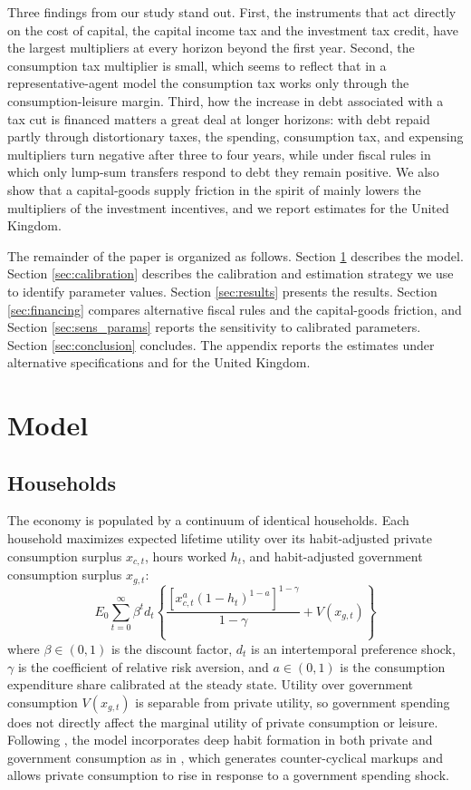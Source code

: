 \documentclass[article,11pt,letterpaper,fleqn]{article}
\theoremstyle{definition}
\numberwithin{equation}{section}
\begin{document}
Three findings from our study stand out. First, the instruments that act directly on the cost of capital, the capital income tax and the investment tax credit, have the largest multipliers at every horizon beyond the first year. Second, the consumption tax multiplier is small, which seems to reflect that in a representative-agent model the consumption tax works only through the consumption-leisure margin. Third, how the increase in debt associated with a tax cut is financed matters a great deal at longer horizons: with debt repaid partly through distortionary taxes, the spending, consumption tax, and expensing multipliers turn negative after three to four years, while under fiscal rules in which only lump-sum transfers respond to debt they remain positive. We also show that a capital-goods supply friction in the spirit of \citet{House_Shapiro_2008} mainly lowers the multipliers of the investment incentives, and we report estimates for the United Kingdom.

The remainder of the paper is organized as follows.  Section \ref{sec:model} describes the model.  Section \ref{sec:calibration} describes the calibration and estimation strategy we use to identify parameter values.  Section \ref{sec:results} presents the results. Section \ref{sec:financing} compares alternative fiscal rules and the capital-goods friction, and Section \ref{sec:sens_params} reports the sensitivity to calibrated parameters.  Section \ref{sec:conclusion} concludes. The appendix reports the estimates under alternative specifications and for the United Kingdom.

\section{Model}
\label{sec:model}

\subsection{Households}
The economy is populated by a continuum of identical households. Each household maximizes expected lifetime utility over its habit-adjusted private consumption surplus $x_{c,t}$, hours worked $h_t$, and habit-adjusted government consumption surplus $x_{g,t}$:
\begin{equation}\label{eq:utility}
E_{0}\sum_{t=0}^{\infty}\beta^{t} d_t \left\{ \frac{\left[x_{c,t}^{a}(1-h_{t})^{1-a}\right]^{1-\gamma}}{1-\gamma} + V(x_{g,t}) \right\}
\end{equation}
where $\beta \in (0,1)$ is the discount factor, $d_t$ is an intertemporal preference shock, $\gamma$ is the coefficient of relative risk aversion, and $a \in (0,1)$ is the consumption expenditure share calibrated at the steady state. Utility over government consumption $V(x_{g,t})$ is separable from private utility, so government spending does not directly affect the marginal utility of private consumption or leisure. Following \citet{Zubairy2014}, the model incorporates deep habit formation in both private and government consumption as in \citet{RSU2006}, which generates counter-cyclical markups and allows private consumption to rise in response to a government spending shock.
\end{document}

